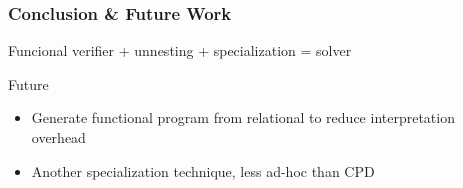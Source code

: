 \documentclass[xcolor=table]{beamer}
\begin{document}
\begin{frame}[fragile]
  \transwipe[direction=90]
  \frametitle{Conclusion \& Future Work}
Funcional verifier + unnesting + specialization = solver
 
Future
 
\begin{itemize} 
  \item Generate functional program from relational to reduce interpretation overhead
  \item Another specialization technique, less ad-hoc than CPD

\end{itemize} 
\end{frame}
\end{document}
